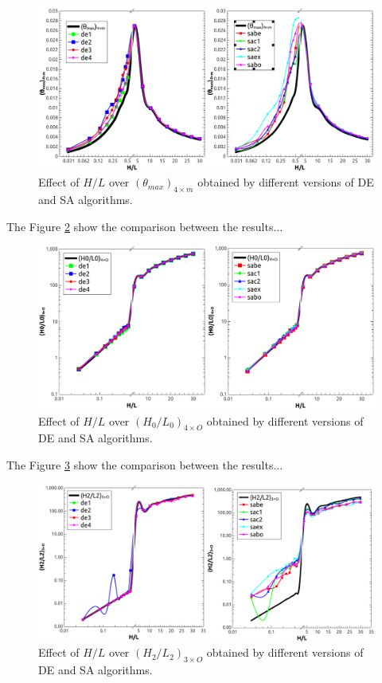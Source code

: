 \documentclass[12pt,fleqn]{article}
\begin{document}
\begin{figure}[H]
\centering
\includegraphics[width=1\linewidth]{imgs/5dof/de_sa_hl_tmin.png}
\caption{ {\small Effect of $H/L$ over $({\theta}_{max})_{4\times m}$ obtained by different versions of DE and SA algorithms.}}
\label{figure04}
\end{figure}

The Figure \ref{figure05} show the comparison between the results...


\begin{figure}[H]
\centering
\includegraphics[width=1\linewidth]{imgs/5dof/de_sa_hl_h0l0.png}
\caption{ {\small Effect of $H/L$ over ${(H_{0}/L_{0})_{4\times O}}$ obtained by different versions of DE and SA algorithms.}}
\label{figure05}
\end{figure}

The Figure \ref{figure06} show the comparison between the results...


\begin{figure}[H]
\centering
\includegraphics[width=1\linewidth]{imgs/5dof/de_sa_hl_h2l2.png}
\caption{ {\small Effect of $H/L$ over ${(H_{2}/L_{2})_{3\times O}}$ obtained by different versions of DE and SA algorithms.}}
\label{figure06}
\end{figure}
\end{document}
